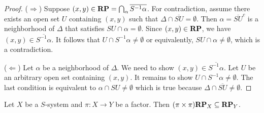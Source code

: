 \begin{proof}
\leanok{}
($\Rightarrow$) Suppose $(x, y) \in \mathbf{RP} = \bigcap_{\alpha} \overline{S^{-1} \alpha}$. For contradiction, assume there exists an open set $U$ containing $(x, y)$ such that $\Delta \cap \overline{S U} = \emptyset$. Then $\alpha = \overline{S U}^c$ is a neighborhood of $\Delta$ that satisfies $SU \cap \alpha = \emptyset$. Since $(x, y) \in \mathbf{RP}$, we have $(x, y) \in \overline{S^{-1} \alpha}$. It follows that $U \cap S^{-1} \alpha \neq \emptyset$ or equivalently, $SU \cap \alpha \neq \emptyset$, which is a contradiction.

($\Leftarrow$) Let $\alpha$ be a neighborhood of $\Delta$. We need to show $(x, y) \in \overline {S^{-1} \alpha}$. Let $U$ be an arbitrary open set containing $(x, y)$. It remains to show $U \cap S^{-1} \alpha \neq \emptyset$. The last condition is equivalent to $\alpha \cap SU \neq \emptyset$ which is true because $\Delta \cap \overline{S U} \neq \emptyset$.



    
\end{proof}

\begin{lemma}
    \label{lemma_frp_functorial_property}
    \leanok{}
    Let $X$ be a $S$-system and $\pi: X \to Y$ be a factor.  Then $(\pi \times \pi) \mathbf{RP}_X \subseteq \mathbf{RP}_Y$.
\end{lemma}


